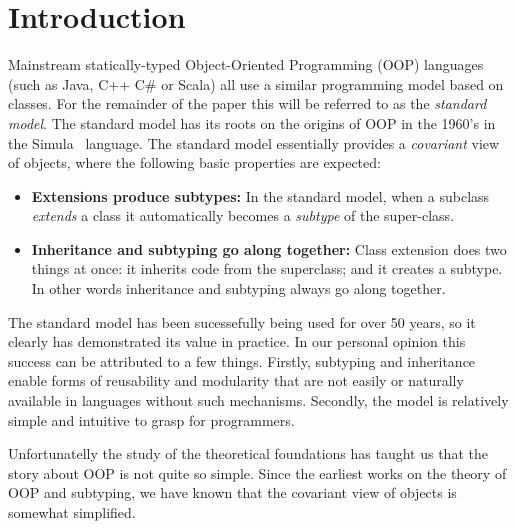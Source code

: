\section{Introduction}

Mainstream statically-typed Object-Oriented Programming (OOP) languages (such as Java,
C++ C\# or Scala) all use a similar programming model based on
classes. For the remainder of the paper this will be referred to as
the \emph{standard model}. The standard model has its roots on the
origins of OOP in the 1960's in the Simula~\cite{} language. 
The standard model essentially provides a \emph{covariant} view of
objects, where the following basic properties are expected:

\begin{itemize}

\item {\bf Extensions produce subtypes:} In the standard model, when a 
subclass \emph{extends} a class it automatically becomes a 
\emph{subtype} of the super-class. 

\item{\bf Inheritance and subtyping go along together:}
Class extension does two things at once: it inherits code from the
superclass; and it creates a subtype. In other words inheritance and
subtyping always go along together. 

\end{itemize}

The standard model has been sucessefully being used for over 50 years,
so it clearly has demonstrated its value in practice. In our personal
opinion this success can be attributed to a few things. Firstly,
subtyping and inheritance enable forms of reusability and modularity 
that are not easily or naturally available in languages without such
mechanisms. Secondly, the model is relatively simple and intuitive 
to grasp for programmers. 

Unfortunatelly the study of the theoretical foundations has
taught us that the story about OOP is not quite so simple. Since the
earliest works on the theory of OOP and subtyping, we have known that 
the covariant view of objects is somewhat simplified. 


